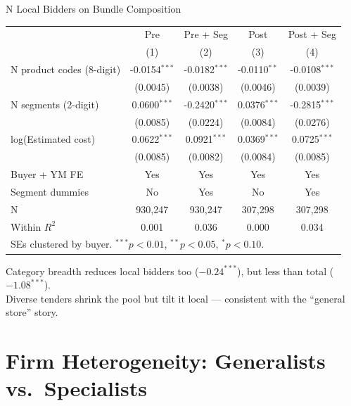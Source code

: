\documentclass[9pt,aspectratio=169]{beamer}
\begin{document}
\begin{frame}{N Local Bidders on Bundle Composition}
\centering\small
\begin{tabular}{lcccc}
\toprule
 & Pre & Pre + Seg & Post & Post + Seg \\
 & (1) & (2) & (3) & (4) \\
\midrule
N product codes (8-digit) & -0.0154$^{***}$ & -0.0182$^{***}$ & -0.0110$^{**}$ & -0.0108$^{***}$ \\
 & (0.0045) & (0.0038) & (0.0046) & (0.0039) \\[2pt]
N segments (2-digit) & 0.0600$^{***}$ & -0.2420$^{***}$ & 0.0376$^{***}$ & -0.2815$^{***}$ \\
 & (0.0085) & (0.0224) & (0.0084) & (0.0276) \\[2pt]
log(Estimated cost) & 0.0622$^{***}$ & 0.0921$^{***}$ & 0.0369$^{***}$ & 0.0725$^{***}$ \\
 & (0.0085) & (0.0082) & (0.0084) & (0.0085) \\[2pt]
\midrule
Buyer + YM FE & Yes & Yes & Yes & Yes \\
Segment dummies & No & Yes & No & Yes \\
N & 930,247 & 930,247 & 307,298 & 307,298 \\
Within $R^2$ & 0.001 & 0.036 & 0.000 & 0.034 \\
\bottomrule
\multicolumn{5}{l}{\footnotesize SEs clustered by buyer. $^{***}p<0.01$, $^{**}p<0.05$, $^{*}p<0.10$.} \\
\end{tabular}

\medskip
\small Category breadth reduces local bidders too ($-0.24^{***}$), but less than total ($-1.08^{***}$). \\
Diverse tenders shrink the pool but tilt it local --- consistent with the ``general store'' story.
\end{frame}

\section{Firm Heterogeneity: Generalists vs.\ Specialists}
\end{document}
